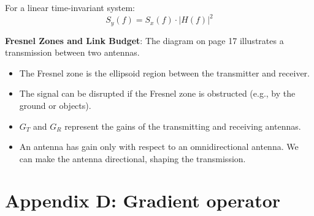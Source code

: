 \documentclass[a4paper, 12pt]{book}
\begin{document}
For a linear time-invariant system:
\begin{equation}
    S_y(f) = S_x(f) \cdot |H(f)|^2
\end{equation}

\begin{purplebox}
\textbf{Fresnel Zones and Link Budget}:
The diagram on page 17 illustrates a transmission between two antennas.
\begin{itemize}
    \item The Fresnel zone is the ellipsoid region between the transmitter and receiver.
    \item The signal can be disrupted if the Fresnel zone is obstructed (e.g., by the ground or objects).
    \item $G_T$ and $G_R$ represent the gains of the transmitting and receiving antennas.
    \item An antenna has gain only with respect to an omnidirectional antenna. We can make the antenna directional, shaping the transmission.
\end{itemize}

\begin{center}
\end{center}
\end{purplebox}

\setcounter{chapter}{4}
\setcounter{section}{0}
\chapter*{Appendix D: Gradient operator}
\end{document}
